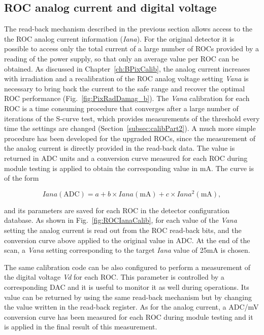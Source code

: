 \subsection{ROC analog current and digital voltage}

The read-back mechanism described in the previous section allows access to the the ROC analog current information (\textit{Iana}).
For the original detector it is possible to access only the total current of a large number of ROCs provided by a reading of the power supply, so that only an average value per ROC can be obtained.
As discussed in Chapter~\ref{ch:BPixCalib}, the analog current increases with irradiation and a recalibration of the ROC analog voltage setting \textit{Vana}
is necessary to bring back the current to the safe range and recover the optimal ROC performance (Fig.~\ref{fig:PixRadDamag_b}).
The \textit{Vana} calibration for each ROC is a time consuming procedure that converges after a large number of iterations of the S-curve test,
which provides measurements of the threshold every time the settings are changed (Section~\ref{subsec:calibPart2}).
A much more simple procedure has been developed for the upgraded ROCs, since the measurement of the analog current is directly provided in the read-back data.
The value is returned in ADC units and a conversion curve measured for each ROC during module testing is applied to obtain the corresponding value in mA.
The curve is of the form

\begin{equation}
Iana (\mathrm{ADC}) = a + b \times Iana (\mathrm{mA}) + c \times Iana^2 (\mathrm{mA}),
\end{equation}

and its parameters are saved for each ROC in the detector configuration database.
As shown in Fig.~\ref{fig:ROCIanaCalib}, for each value of the \textit{Vana} setting the analog current is read out from the ROC read-back bits,
and the conversion curve above applied to the original value in ADC.
At the end of the scan, a \textit{Vana} setting corresponding to the target \textit{Iana} value of 25\unit{mA} is chosen.

The same calibration code can be also configured to perform a measurement of the digital voltage \textit{Vd} for each ROC.
This parameter is controlled by a corresponding DAC and it is useful to monitor it as well during operations.
Its value can be returned by using the same read-back mechanism but by changing the value written in the read-back register.
As for the analog current, a ADC/mV conversion curve has been measured for each ROC during module testing
and it is applied in the final result of this measurement.\\

